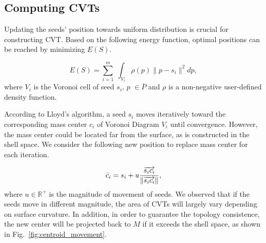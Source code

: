 \vspace{-0.4cm}

\subsection{Computing CVTs}
\label{sec:RCVT}

   Updating the seeds' position towards uniform distribution is crucial for constructing CVT.
   Based on the following energy function, optimal positions can be reached by minimizing $E(S)$.

  \vspace{-0.8cm}

  \begin{displaymath}
  E(S) = \sum \limits_{i=1}^m \; \int_{V_i}\rho (\mathit{p}) \|\mathit{p}-s_i\|^2 \mathit{d}\mathit{p},%
  \end{displaymath}
  where $V_i$ is the Voronoi cell of seed $s_i$, $p$ $\in \bar{P}$ and  $\rho$ is a non-negative user-defined density function.

  According to Lloyd's algorithm, a seed $s_i$ moves iteratively toward the corresponding mass center $c_i$ of Voronoi Diagram $V_i$ until convergence.
  However, the mass center could be located far from the surface, as is constructed in the shell space.
  We consider the following new position to replace mass center for each iteration.

  \vspace{-0.5cm}
  \begin{displaymath}
  \bar{c}_i = s_i + u\frac{\protect \overrightarrow{s_ic_i}}{\|\protect \overrightarrow{s_ic_i}\|},
  \end{displaymath}
  where $u\in\mathbb{R}^{+}$ is the magnitude of movement of seeds.
  We observed that if the seeds move in different magnitude, the area of CVTs will largely vary depending on surface curvature.
  In addition, in order to guarantee the topology consistence, the new center will be projected back to $M$ if it exceeds the shell space, as shown in Fig.~\ref{fig:centroid_movement}.

